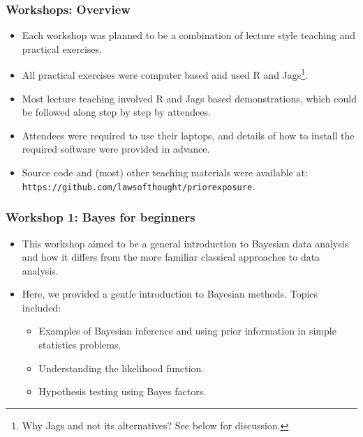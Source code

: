 \begin{frame}
	\frametitle{Workshops: Overview}

	\begin{itemize}
		\item Each workshop was planned to be a combination of lecture style teaching and practical exercises.
		\item All practical exercises were computer based and used R and Jags\footnote{Why Jags and not its alternatives? See below for discussion.}.
		\item Most lecture teaching involved R and Jags based demonstrations, which could be followed along step by step by attendees.
		\item Attendees were required to use their laptops, and details of how to install the required software were provided in advance.
		\item Source code and (most) other teaching materials were available at: \texttt{https://github.com/lawsofthought/priorexposure}.
	\end{itemize}

\end{frame}

\begin{frame}
	\frametitle{Workshop 1: Bayes for beginners}

	\begin{itemize}
		\item This workshop aimed to be a general introduction to Bayesian data analysis and how it differs from the more familiar classical approaches to data analysis.
		\item Here, we provided a gentle introduction to Bayesian methods. Topics included:
			\begin{itemize}
				\item Examples of Bayesian inference and using prior information in simple statistics problems.
				\item Understanding the likelihood function.
				\item Hypothesis testing using Bayes factors.
			\end{itemize}
	\end{itemize}

\end{frame}


